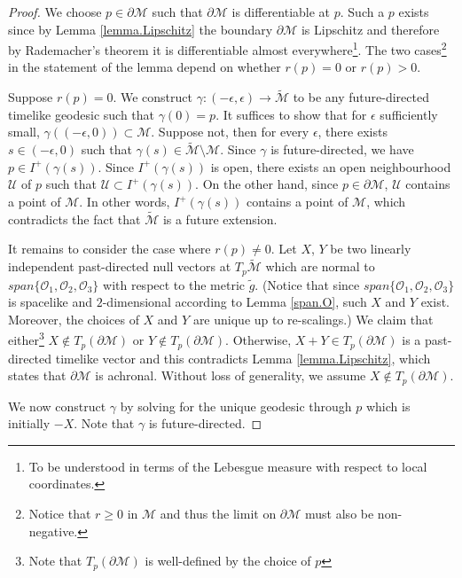 \documentclass[10pt, reqno]{amsart}
\theoremstyle{definition}
\theoremstyle{remark}
\numberwithin{equation}{section}
\newcommand{\rd}{\partial}
\newcommand{\0}{\emptyset}
\newcommand{\calM}{\mathcal M}
\begin{document}
\begin{proof}
We choose $p\in \rd\mathcal M$ such that $\rd\mathcal M$ is differentiable at $p$. Such a $p$ exists since by Lemma \ref{lemma.Lipschitz} the boundary $\rd \calM$ is Lipschitz and therefore by Rademacher's theorem it is differentiable almost everywhere\footnote{To be understood in terms of the Lebesgue measure with respect to local coordinates.}. The two cases\footnote{Notice that $r\geq 0$ in $\mathcal M$ and thus the limit on $\rd\mathcal M$ must also be non-negative.} in the statement of the lemma depend on whether $r(p)=0$ or $r(p)>0$.

Suppose $r(p)=0$. We construct $\gamma:(-\epsilon,\epsilon)\to \widetilde{\mathcal M}$ to be any future-directed timelike geodesic such that $\gamma(0)=p$. It suffices to show that for $\epsilon$ sufficiently small, $\gamma((-\epsilon,0))\subset\mathcal M$. Suppose not, then for every $\epsilon$, there exists $s\in (-\epsilon,0)$ such that $\gamma(s)\in \widetilde{\mathcal M}\setminus\mathcal M$. Since $\gamma$ is future-directed, we have $p\in I^+(\gamma(s))$. Since $I^+(\gamma(s))$ is open, there exists an open neighbourhood $\mathcal U$ of $p$ such that $\mathcal U\subset I^+(\gamma(s))$. On the other hand, since $p\in\rd\mathcal M$, $\mathcal U$ contains a point of $\mathcal M$. In other words, $I^+(\gamma(s))$ contains a point of $\mathcal M$, which contradicts the fact that $\widetilde{\mathcal M}$ is a future extension.

It remains to consider the case where $r(p)\neq 0$. Let $X$, $Y$ be two linearly independent past-directed null vectors at $T_p\widetilde{\mathcal M}$ which are normal to $span\{\mathcal O_1, \mathcal O_2, \mathcal O_3\}$ with respect to the metric $\tilde{g}$. (Notice that since $span\{\mathcal O_1, \mathcal O_2, \mathcal O_3\}$ is spacelike and $2$-dimensional according to Lemma \ref{span.O}, such $X$ and $Y$ exist. Moreover, the choices of $X$ and $Y$ are unique up to re-scalings.) We claim that either\footnote{Note that $T_p (\rd\mathcal M)$ is well-defined by the choice of $p$} $X\not\in T_p (\rd\mathcal M)$ or $Y\not\in T_p (\rd\mathcal M)$. Otherwise, $X+Y\in T_p(\rd\mathcal M)$ is a past-directed timelike vector and this contradicts Lemma \ref{lemma.Lipschitz}, which states that $\rd\mathcal M$ is achronal. Without loss of generality, we assume $X\not\in T_p (\rd\mathcal M)$.

We now construct $\gamma$ by solving for the unique geodesic through $p$ which is initially $-X$. Note that $\gamma$ is future-directed.


\end{proof}
\end{document}
